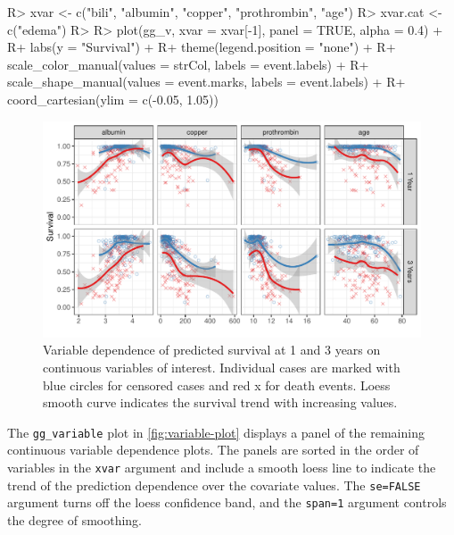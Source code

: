 \documentclass[article]{jss}
\begin{document}
\begin{Schunk}
\begin{Sinput}
R> xvar <- c("bili", "albumin", "copper", "prothrombin", "age")
R> xvar.cat <- c("edema")
R> 
R> plot(gg_v, xvar = xvar[-1], panel = TRUE, alpha = 0.4) +
R+   labs(y = "Survival") +
R+   theme(legend.position = "none") +
R+   scale_color_manual(values = strCol, labels = event.labels) +
R+   scale_shape_manual(values = event.marks, labels = event.labels) +
R+   coord_cartesian(ylim = c(-0.05, 1.05))
\end{Sinput}
\begin{figure}[!htb]

{\centering \includegraphics{rfs-variable-plot-1} 

}

\caption[Variable dependence of predicted survival at 1 and 3 years on continuous variables of interest]{Variable dependence of predicted survival at 1 and 3 years on continuous variables of interest. Individual cases are marked with blue circles for censored cases and red x for death events. Loess smooth curve indicates the survival trend with increasing values.}\label{fig:variable-plot}
\end{figure}
\end{Schunk}

The \texttt{gg\_variable} plot in \autoref{fig:variable-plot} displays a
panel of the remaining continuous variable dependence plots. The panels
are sorted in the order of variables in the \texttt{xvar} argument and
include a smooth loess line \citep{cleveland:1981, cleveland:1988} to
indicate the trend of the prediction dependence over the covariate
values. The \texttt{se=FALSE} argument turns off the loess confidence
band, and the \texttt{span=1} argument controls the degree of smoothing.
\end{document}
